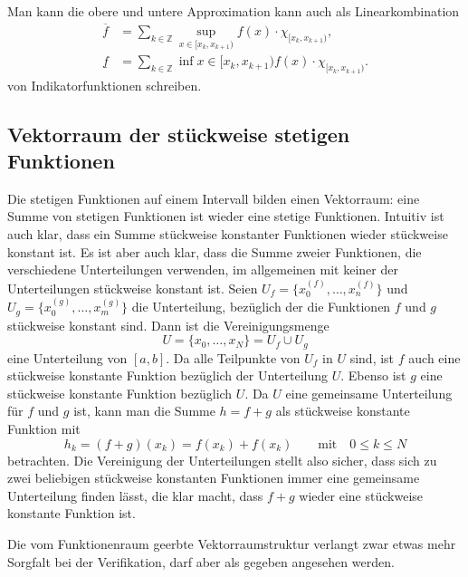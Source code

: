 Man kann die obere und untere Approximation kann auch als Linearkombination
\begin{align*}
\overline{f}
&=
\sum_{k\in\mathbb Z} \sup_{x\in[x_k,x_{k+1})}f(x)\cdot \chi_{[x_k,x_{k+1})},
\\
\underline{f}
&=
\sum_{k\in\mathbb Z} \inf{x\in[x_k,x_{k+1})}f(x)\cdot \chi_{[x_k,x_{k+1})}.
\end{align*}
von Indikatorfunktionen schreiben.

\subsection{Vektorraum der stückweise stetigen Funktionen}
Die stetigen Funktionen auf einem Intervall bilden einen Vektorraum: eine
Summe von stetigen Funktionen ist wieder eine stetige Funktionen.
Intuitiv ist auch klar, dass ein Summe stückweise konstanter Funktionen
wieder stückweise konstant ist.
Es ist aber auch klar, dass die Summe zweier Funktionen, die verschiedene
Unterteilungen verwenden, im allgemeinen mit keiner der Unterteilungen
stückweise konstant ist.
Seien $U_f=\{x_0^{(f)},\dots,x_n^{(f)}\}$ und
$U_g=\{x_0^{(g)},\dots,x_m^{(g)}\}$ die Unterteilung, bezüglich der 
die Funktionen $f$ und $g$ stückweise konstant sind.
Dann ist die Vereinigungsmenge
\[
U= \{x_0,\dots,x_N\} = U_f\cup U_g
\]
eine Unterteilung von $[a,b]$.
Da alle Teilpunkte von $U_f$ in $U$ sind, ist $f$ auch eine stückweise
konstante Funktion bezüglich der Unterteilung $U$. 
Ebenso ist $g$ eine stückweise konstante Funktion bezüglich $U$.
Da $U$ eine gemeinsame Unterteilung für $f$ und $g$ ist, kann man
die Summe $h=f+g$ als stückweise konstante Funktion mit
\[
h_k
=
(f+g)(x_k)
= 
f(x_k) + f(x_k)
\qquad\text{mit}\quad
0\le k\le N
\]
betrachten.
Die Vereinigung der Unterteilungen stellt also sicher, dass sich
zu zwei beliebigen stückweise konstanten Funktionen immer eine
gemeinsame Unterteilung finden lässt, die klar macht, dass $f+g$
wieder eine stückweise konstante Funktion ist.

Die vom Funktionenraum geerbte Vektorraumstruktur verlangt zwar etwas
mehr Sorgfalt bei der Verifikation, darf aber als gegeben angesehen
werden.

